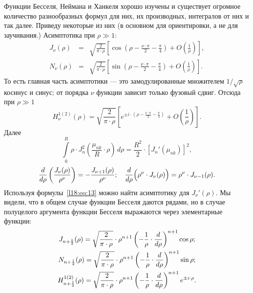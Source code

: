 Функции Бесселя, Неймана и Ханкеля хорошо изучены и существует огромное количество разнообразных формул для них, их производных, интегралов от них и так далее. Приведу некоторые из них (в основном для ориентировки, а не для заучивания.) Асимптотика при $\rho\gg1$:
\begin{equation*}
	\begin{array}{rcl}
		J_{\nu}(\rho)&=&\displaystyle\sqrt{\frac{2}{\pi\cdot\rho}}\left[\cos\left(\rho-\frac{\nu\cdot\pi}{2}-\frac{\pi}{4}\right)+O\left(\frac{1}{\rho}\right)\right],\\[12pt]
		N_{\nu}(\rho)&=&\displaystyle\sqrt{\frac{2}{\pi\cdot\rho}}\left[\sin\left(\rho-\frac{\nu\cdot\pi}{2}-\frac{\pi}{4}\right)+O\left(\frac{1}{\rho}\right)\right].
	\end{array}
\end{equation*}
То есть главная часть асимптотики --- это замодулированные множителем $1/\sqrt{\rho}$ косинус и синус; от порядка $\nu$ функции зависит только фузовый сдвиг. Отсюда при $\rho\gg1$
\begin{equation*}
	 H_{\nu}^{1(2)}(\rho)=\displaystyle\sqrt{\frac{2}{\pi\cdot\rho}}\left[e^{\textstyle \pm i\cdot\left(\textstyle\rho-\frac{\nu\cdot\pi}{2}-\frac{\pi}{4}\right)}+O\left(\frac{1}{\rho}\right)\right].
\end{equation*} 
Далее
\begin{equation*}
	\int\limits_{0}^{R}\rho\cdot J_{n}^2\left(\frac{\mu_{nk}}{R}\cdot\rho\right)\,d\rho=\frac{R^2}{2}\cdot\left[J_n'(\mu_{nk})\right]^2,
\end{equation*}
\begin{equation}\label{l18:eq:13}
	\frac{d}{d\rho}\left(\frac{J_{\nu}(\rho)}{\rho^{\nu}}\right)=-\frac{J_{\nu+1}(\rho)}{\rho^{\nu}};\quad\frac{d}{d\rho}\Big(\rho^{\nu}\cdot J_{\nu}(\rho)\Big)=\rho^{\nu}\cdot J_{\nu-1}(\rho).		
\end{equation}
Используя формулы~\eqref{l18:eq:13} можно найти асимптотику для $J_{\nu}'(\rho)$.  Мы видели, что в общем случае функции Бесселя даются рядами, но в случае полуцелого аргумента функции Бесселя выражаются через элементарные функции:
\begin{gather*}
	 J_{n+\frac{1}{2}}(\rho)=\sqrt{\frac{2}{\pi\cdot\rho}}\cdot\rho^{n+1}\left(-\frac{1}{\rho}\cdot\frac{d}{d\rho}\right)^{n+1}\cos\rho;\\ N_{n+\frac{1}{2}}(\rho)=\sqrt{\frac{2}{\pi\cdot\rho}}\cdot\rho^{n+1}\left(-\frac{1}{\rho}\cdot\frac{d}{d\rho}\right)^{n+1}\sin\rho;\\
	 H_{n+\frac{1}{2}}^{1(2)}(\rho)=\sqrt{\frac{2}{\pi\cdot\rho}}\cdot\rho^{n+1}\left(-\frac{1}{\rho}\cdot\frac{d}{d\rho}\right)^{n+1}e^{\pm i\cdot\rho}.
\end{gather*}

